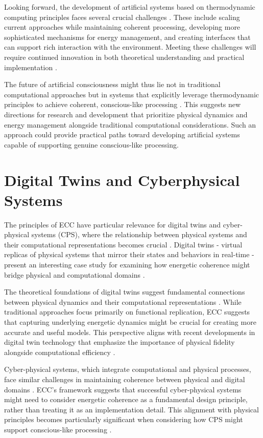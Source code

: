 \begin{refsection}
Looking forward, the development of artificial systems based on thermodynamic computing principles faces several crucial challenges \cite{Hinrichsen2019}. These include scaling current approaches while maintaining coherent processing, developing more sophisticated mechanisms for energy management, and creating interfaces that can support rich interaction with the environment. Meeting these challenges will require continued innovation in both theoretical understanding and practical implementation \cite{Kolchinsky2020}.

The future of artificial consciousness might thus lie not in traditional computational approaches but in systems that explicitly leverage thermodynamic principles to achieve coherent, conscious-like processing \cite{Maroney2019}. This suggests new directions for research and development that prioritize physical dynamics and energy management alongside traditional computational considerations. Such an approach could provide practical paths toward developing artificial systems capable of supporting genuine conscious-like processing.

\section{Digital Twins and Cyberphysical Systems}

The principles of ECC have particular relevance for digital twins and cyber-physical systems (CPS), where the relationship between physical systems and their computational representations becomes crucial \cite{Fuller2020}. Digital twins - virtual replicas of physical systems that mirror their states and behaviors in real-time - present an interesting case study for examining how energetic coherence might bridge physical and computational domains \cite{Jones2020}.

The theoretical foundations of digital twins suggest fundamental connections between physical dynamics and their computational representations \cite{Madni2019}. While traditional approaches focus primarily on functional replication, ECC suggests that capturing underlying energetic dynamics might be crucial for creating more accurate and useful models. This perspective aligns with recent developments in digital twin technology that emphasize the importance of physical fidelity alongside computational efficiency \cite{Minerva2020}.

Cyber-physical systems, which integrate computational and physical processes, face similar challenges in maintaining coherence between physical and digital domains \cite{Lee2018}. ECC's framework suggests that successful cyber-physical systems might need to consider energetic coherence as a fundamental design principle, rather than treating it as an implementation detail. This alignment with physical principles becomes particularly significant when considering how CPS might support conscious-like processing \cite{Rajkumar2018}.


\end{refsection}
